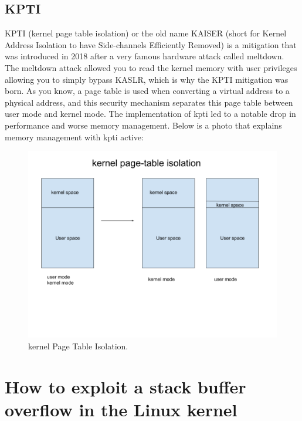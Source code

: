     \subsection{KPTI}
    KPTI (kernel page table isolation) or the old name KAISER (short for Kernel Address Isolation to have Side-channels Efficiently Removed) is a mitigation that was introduced in 2018 after a very famous hardware attack called meltdown.\newline
    The meltdown attack allowed you to read the kernel memory with user privileges allowing you to simply bypass KASLR, which is why the KPTI mitigation was born.\newline
    As you know, a page table is used when converting a virtual address to a physical address, and this security mechanism separates this page table between user mode and kernel mode.\newline
    The implementation of kpti led to a notable drop in performance and worse memory management.\newline
    Below is a photo that explains memory management with kpti active: \newline
    \begin{figure}[htbp]
        \centering
        \includegraphics[width=1\linewidth]{Images/kpti.png}
        \caption{kernel Page Table Isolation.}
        \label{fig:enter-label}
    \end{figure}
    \clearpage
    \section{How to exploit a stack buffer overflow in the Linux kernel}
